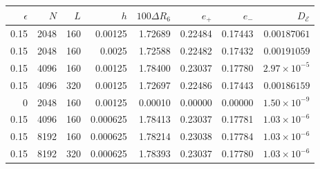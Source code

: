 \begin{tabular}{rrrrrrrr}
\toprule
$\epsilon$ & $N$ & $L$ & $h$ & $100\Delta R_6$ & $e_+$ & $e_-$ & $D_{\mathcal E}$ \\
\midrule
0.15 & 2048 & 160 & 0.00125 & 1.72689 & 0.22484 & 0.17443 & $0.00187061$ \\
0.15 & 2048 & 160 & 0.0025 & 1.72588 & 0.22482 & 0.17432 & $0.00191059$ \\
0.15 & 4096 & 160 & 0.00125 & 1.78400 & 0.23037 & 0.17780 & $2.97\times10^{-5}$ \\
0.15 & 4096 & 320 & 0.00125 & 1.72697 & 0.22486 & 0.17443 & $0.00186159$ \\
0 & 2048 & 160 & 0.00125 & 0.00010 & 0.00000 & 0.00000 & $1.50\times10^{-9}$ \\
0.15 & 4096 & 160 & 0.000625 & 1.78413 & 0.23037 & 0.17781 & $1.03\times10^{-6}$ \\
0.15 & 8192 & 160 & 0.000625 & 1.78214 & 0.23038 & 0.17784 & $1.03\times10^{-6}$ \\
0.15 & 8192 & 320 & 0.000625 & 1.78393 & 0.23037 & 0.17780 & $1.03\times10^{-6}$ \\
\bottomrule
\end{tabular}
